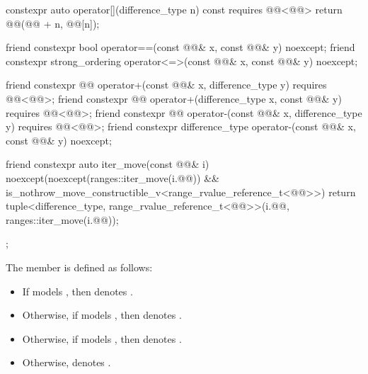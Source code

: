 \begin{codeblock}
{{    constexpr auto operator[](difference_type n) const
      requires @@<@@>
    { return @@(@@ + n, @@[n]); }

    friend constexpr bool operator==(const @@& x, const @@& y) noexcept;
    friend constexpr strong_ordering operator<=>(const @@& x, const @@& y) noexcept;

    friend constexpr @@ operator+(const @@& x, difference_type y)
      requires @@<@@>;
    friend constexpr @@ operator+(difference_type x, const @@& y)
      requires @@<@@>;
    friend constexpr @@ operator-(const @@& x, difference_type y)
      requires @@<@@>;
    friend constexpr difference_type operator-(const @@& x, const @@& y) noexcept;

    friend constexpr auto iter_move(const @@& i)
      noexcept(noexcept(ranges::iter_move(i.@@)) &&
               is_nothrow_move_constructible_v<range_rvalue_reference_t<@@>>) {
      return tuple<difference_type,
                   range_rvalue_reference_t<@@>>(i.@@, ranges::iter_move(i.@@));
    }
  };
}
\end{codeblock}

\pnum
The member 
is defined as follows:
\begin{itemize}
\item
If  models ,
then  denotes .
\item
Otherwise, if  models ,
then  denotes .
\item
Otherwise, if  models ,
then  denotes .
\item
Otherwise,  denotes .
\end{itemize}

